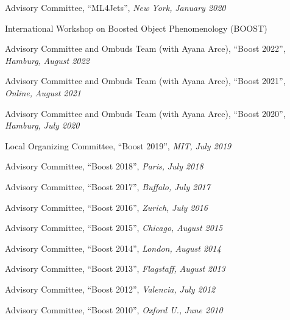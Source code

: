 \item Advisory Committee, ``ML4Jets'', \emph{New York, }\emph{January 2020}
\el 
\item International Workshop on Boosted Object Phenomenology (BOOST)
\bsbl 
\item Advisory Committee and Ombuds Team (with Ayana Arce), ``Boost 2022'', \emph{Hamburg, }\emph{August 2022}
\item Advisory Committee and Ombuds Team (with Ayana Arce), ``Boost 2021'', \emph{Online, }\emph{August 2021}
\item Advisory Committee and Ombuds Team (with Ayana Arce), ``Boost 2020'', \emph{Hamburg, }\emph{July 2020}
\item Local Organizing Committee, ``Boost 2019'', \emph{MIT, }\emph{July 2019}
\item Advisory Committee, ``Boost 2018'', \emph{Paris, }\emph{July 2018}
\item Advisory Committee, ``Boost 2017'', \emph{Buffalo, }\emph{July 2017}
\item Advisory Committee, ``Boost 2016'', \emph{Zurich, }\emph{July 2016}
\item Advisory Committee, ``Boost 2015'', \emph{Chicago, }\emph{August 2015}
\item Advisory Committee, ``Boost 2014'', \emph{London, }\emph{August 2014}
\item Advisory Committee, ``Boost 2013'', \emph{Flagstaff, }\emph{August 2013}
\item Advisory Committee, ``Boost 2012'', \emph{Valencia, }\emph{July 2012}
\item Advisory Committee, ``Boost 2010'', \emph{Oxford U., }\emph{June 2010}
\el 
